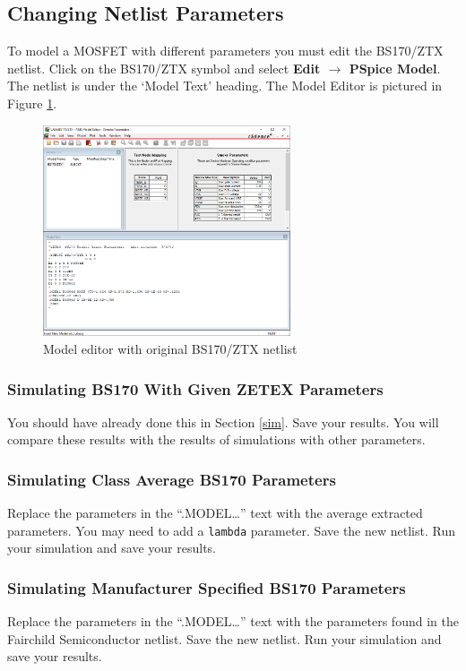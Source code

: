\documentclass[12pt]{../manual}
\begin{document}
\newpage
\subsection{Changing Netlist Parameters}
To model a MOSFET with different parameters you must edit the BS170/ZTX netlist. Click on the BS170/ZTX symbol and select \textbf{Edit $\to$ PSpice Model}. The netlist is under the `Model Text’ heading. The Model Editor is pictured in Figure \ref{fig:netlist}.

\begin{figure}[ht!]
\begin{center}
\includegraphics[width=0.65\textwidth]{figures/modelEditor}
\end{center}
\caption{Model editor with original BS170/ZTX netlist}
\label{fig:netlist}
\end{figure}

\subsubsection{Simulating BS170 With Given ZETEX Parameters}
You should have already done this in Section \ref{sim}. Save your results. You will compare these results with the results of simulations with other parameters.

\subsubsection{Simulating Class Average BS170 Parameters}
Replace the parameters in the ``.MODEL\dots'' text with the average extracted parameters. You may need to add a {\tt lambda} parameter. Save the new netlist. Run your simulation and save your results.

\subsubsection{Simulating Manufacturer Specified BS170 Parameters}
Replace the parameters in the ``.MODEL\dots'' text with the parameters found in the Fairchild Semiconductor netlist. Save the new netlist. Run your simulation and save your results.
\end{document}
